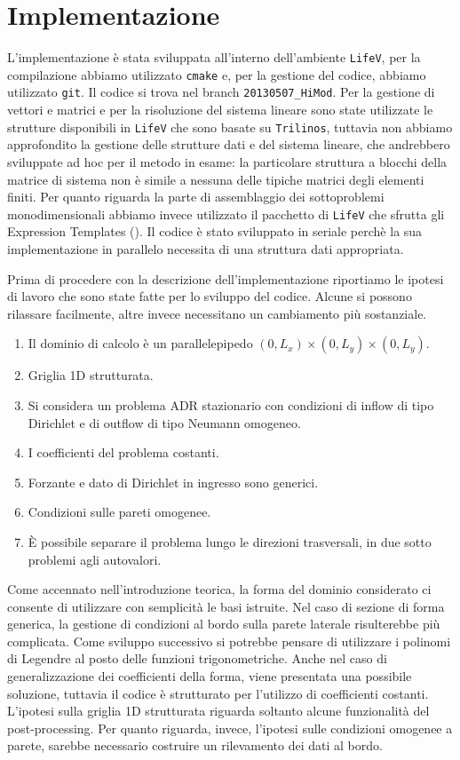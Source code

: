 \chapter{Implementazione}

L'implementazione \`e stata sviluppata all'interno dell'ambiente \texttt{LifeV}, per la compilazione abbiamo utilizzato \texttt{cmake} 
e, per la gestione del codice, abbiamo utilizzato \texttt{git}. Il codice si trova nel branch \texttt{20130507\_HiMod}.
Per la gestione di vettori e matrici e per la risoluzione del sistema lineare sono state utilizzate le strutture disponibili
in \texttt{LifeV} che sono basate su \texttt{Trilinos}, tuttavia non abbiamo approfondito la gestione 
delle strutture dati e del sistema lineare, che andrebbero sviluppate ad hoc per il metodo in esame: 
la particolare struttura a blocchi della matrice di sistema non \`e simile a nessuna delle tipiche
matrici degli elementi finiti. Per quanto riguarda la parte di assemblaggio dei sottoproblemi monodimensionali
abbiamo invece utilizzato il pacchetto di \texttt{LifeV} che sfrutta gli Expression Templates ().
Il codice \`e stato sviluppato in seriale perch\`e la sua implementazione in parallelo necessita di una
struttura dati appropriata.

Prima di procedere con la descrizione dell'implementazione riportiamo le ipotesi 
di lavoro che sono state fatte per lo sviluppo del codice. Alcune si possono rilassare facilmente,
altre invece necessitano un cambiamento pi\`u sostanziale.
\begin{enumerate}[label=\Roman{*} -, ref=(\Roman{*})]
\item Il dominio di calcolo \`e un parallelepipedo $(0,L_x)\times(0,L_y)\times(0,L_y)$.
\item Griglia 1D strutturata.
\item Si considera un problema ADR stazionario con condizioni di inflow di tipo Dirichlet e di outflow di tipo Neumann omogeneo.
\item I coefficienti del problema costanti.
\item Forzante e dato di Dirichlet in ingresso sono generici.
\item Condizioni sulle pareti omogenee.
\item \`E possibile separare il problema lungo le direzioni trasversali, in due sotto problemi agli autovalori.
\end{enumerate}

Come accennato nell'introduzione teorica, la forma del dominio considerato ci consente di utilizzare con semplicit\`a le basi istruite. 
Nel caso di sezione di forma generica, la gestione di condizioni al bordo sulla parete laterale risulterebbe pi\`u complicata.
Come sviluppo successivo si potrebbe pensare di utilizzare i polinomi di Legendre al posto delle funzioni trigonometriche.
Anche nel caso di generalizzazione dei coefficienti della forma, viene presentata una possibile soluzione, 
tuttavia il codice \`e strutturato per l'utilizzo di coefficienti costanti.
L'ipotesi sulla griglia 1D strutturata riguarda soltanto alcune funzionalit\`a del post-processing.
Per quanto riguarda, invece, l'ipotesi sulle condizioni omogenee a parete, sarebbe necessario costruire un rilevamento dei dati al bordo.

